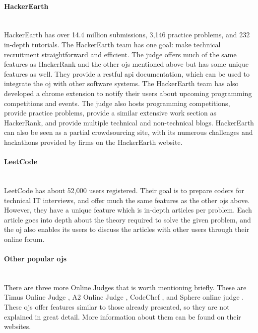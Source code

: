 \paragraph*{HackerEarth} \hfill \\
HackerEarth \cite{HACKEREARTH} has over 14.4 million submissions, 3,146 practice problems, and 232 in-depth tutorials. The HackerEarth team has one goal: make technical recruitment straightforward and efficient. The judge offers much of the same features as HackerRank and the other \glspl{oj} mentioned above but has some unique features as well. They provide a \gls{rest}ful \gls{api} documentation, which can be used to integrate the \gls{oj} with other software systems. The HackerEarth team has also developed a chrome extension to notify their users about upcoming programming competitions and events. The judge also hosts programming competitions, provide practice problems, provide a similar extensive work section as HackerRank, and provide multiple technical and non-technical blogs. HackerEarth can also be seen as a partial crowdsourcing site, with its numerous challenges and hackathons provided by firms on the HackerEarth website.

\paragraph*{LeetCode} \hfill \\
LeetCode \cite{LEETCODE} has about 52,000 users registered. Their goal is to prepare coders for technical IT interviews, and offer much the same features as the other \glspl{oj} above. However, they have a unique feature which is in-depth articles per problem. Each article goes into depth about the theory required to solve the given problem, and the \gls{oj} also enables its users to discuss the articles with other users through their online forum.

\paragraph*{Other popular \glspl{oj}} \hfill \\
There are three more Online Judges that is worth mentioning briefly. These are Timus Online Judge \cite{TIMUS}, A2 Online Judge \cite{A2OJ}, CodeChef \cite{CODECHEF}, and Sphere online judge \cite{SPHERE}. These \glspl{oj} offer features similar to those already presented, so they are not explained in great detail. More information about them can be found on their websites.

